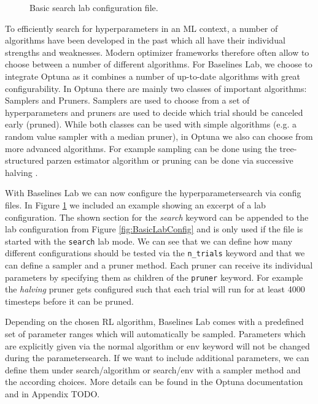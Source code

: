 \begin{figure}[ht]
    
    \caption{Basic search lab configuration file.}
    \label{fig:BasicSearchConfig}
\end{figure}

To efficiently search for hyperparameters in an ML context, a number of algorithms have been developed in the past which all have their individual strengths and weaknesses. Modern optimizer frameworks therefore often allow to choose between a number of different algorithms. For Baselines Lab, we choose to integrate Optuna \cite{akiba2019optuna} as it combines a number of up-to-date algorithms with great configurability. In Optuna there are mainly two classes of important algorithms: Samplers and Pruners. Samplers are used to choose from a set of hyperparameters and pruners are used to decide which trial should be canceled early (pruned). While both classes can be used with simple algorithms (e.g. a random value sampler with a median pruner), in Optuna we also can choose from more advanced algorithms. For example sampling can be done using the tree-structured parzen estimator algorithm \cite{bergstra2011algorithms} or pruning can be done via successive halving \cite{karnin2013almost}.

With Baselines Lab we can now configure the hyperparametersearch via config files. In Figure \ref{fig:BasicSearchConfig} we included an example showing an excerpt of a lab configuration. The shown section for the \textit{search} keyword can be appended to the lab configuration from Figure \ref{fig:BasicLabConfig} and is only used if the file is started with the \texttt{search} lab mode. We can see that we can define how many different configurations should be tested via the \texttt{n\_trials} keyword and that we can define a sampler and a pruner method. Each pruner can receive its individual parameters by specifying them as children of the \texttt{pruner} keyword. For example the \textit{halving} pruner gets configured such that each trial will run for at least 4000 timesteps before it can be pruned.

Depending on the chosen RL algorithm, Baselines Lab comes with a predefined set of parameter ranges which will automatically be sampled. Parameters which are explicitly given via the normal algorithm or env keyword will not be changed during the parametersearch. If we want to include additional parameters, we can define them under search/algorithm or search/env with a sampler method and the according choices. More details can be found in the Optuna documentation \cite{optuna-docs} and in Appendix TODO.

